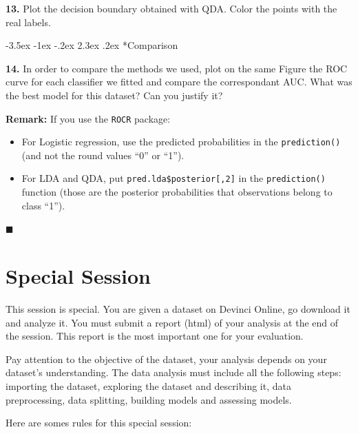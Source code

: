 \documentclass[]{book}
\makeatletter
\providecommand{\tightlist}{%
  \setlength{\itemsep}{0pt}\setlength{\parskip}{0pt}}
\renewcommand\section{\@startsection {section}{1}{\z@}%
                                   {-3.5ex \@plus -1ex \@minus -.2ex}%
                                   {2.3ex \@plus.2ex}%
                                   {\normalfont\Large\bfseries\color{ForestGreen}}}
\theoremstyle{definition}
\theoremstyle{definition}
\theoremstyle{definition}
\theoremstyle{remark}
\makeatother
\begin{document}
\textbf{13.} Plot the decision boundary obtained with QDA. Color the
points with the real labels.

\section*{Comparison}\label{comparison}

\textbf{14.} In order to compare the methods we used, plot on the same
Figure the ROC curve for each classifier we fitted and compare the
correspondant AUC. What was the best model for this dataset? Can you
justify it?

\textbf{Remark:} If you use the \texttt{ROCR} package:

\begin{itemize}
\tightlist
\item
  For Logistic regression, use the predicted probabilities in the
  \texttt{prediction()} (and not the round values ``0'' or ``1'').
\item
  For LDA and QDA, put \texttt{pred.lda\$posterior{[},2{]}} in the
  \texttt{prediction()} function (those are the posterior probabilities
  that observations belong to class ``1'').
\end{itemize}

◼

\chapter{Special Session}\label{special-session}

This session is special. You are given a dataset on Devinci Online, go
download it and analyze it. You must submit a report (html) of your
analysis at the end of the session. This report is the most important
one for your evaluation.

Pay attention to the objective of the dataset, your analysis depends on
your dataset's understanding. The data analysis must include all the
following steps: importing the dataset, exploring the dataset and
describing it, data preprocessing, data splitting, building models and
assessing models.

Here are somes rules for this special session:
\end{document}
